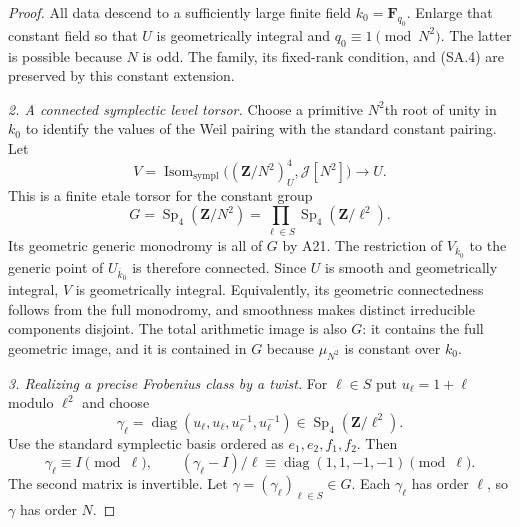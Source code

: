 \begin{proof}
All data descend to a sufficiently large finite field
$k_0=\mathbf F_{q_0}$.  Enlarge that constant field so
that $U$ is geometrically integral and
$q_0\equiv1\pmod{N^2}$.  The latter is possible because
$N$ is odd.  The family, its fixed-rank condition,
and (SA.4) are preserved by this constant extension.

\emph{2. A connected symplectic level torsor.}
Choose a primitive $N^2$th root of unity in $k_0$ to
identify the values of the Weil pairing with the standard
constant pairing.  Let
\[
 V=\operatorname{Isom}_{\mathrm{sympl}}
       \bigl((\mathbf Z/N^2)^4_U,\mathcal J[N^2]\bigr)
                      \longrightarrow U.                    \tag{SA.5}
\]
This is a finite etale torsor for the constant group
\[
       G=\operatorname{Sp}_4(\mathbf Z/N^2)
        =\prod_{\ell\in S}
                       \operatorname{Sp}_4(\mathbf Z/\ell^2).
\]
Its geometric generic monodromy is all of $G$ by A21.
The restriction of $V_{\overline{k}_0}$ to the generic
point of $U_{\overline{k}_0}$ is therefore connected.
Since $U$ is smooth and
geometrically integral, $V$ is geometrically integral.
Equivalently, its geometric connectedness follows from
the full monodromy, and smoothness makes distinct
irreducible components disjoint.
The total arithmetic image is also $G$: it contains
the full geometric image, and it is contained in $G$
because $\mu_{N^2}$ is constant over $k_0$.

\emph{3. Realizing a precise Frobenius class by a twist.}
For $\ell\in S$ put $u_\ell=1+\ell$ modulo $\ell^2$ and
choose
\[
 \gamma_\ell=
 \operatorname{diag}(u_\ell,u_\ell,
                         u_\ell^{-1},u_\ell^{-1})
     \in\operatorname{Sp}_4(\mathbf Z/\ell^2).
                                                               \tag{SA.6}
\]
Use the standard symplectic basis ordered as
$e_1,e_2,f_1,f_2$.  Then
\[
 \gamma_\ell\equiv I\pmod\ell,\qquad
 (\gamma_\ell-I)/\ell
                   \equiv\operatorname{diag}(1,1,-1,-1)
                             \pmod\ell.                       \tag{SA.7}
\]
The second matrix is invertible.
Let $\gamma=(\gamma_\ell)_{\ell\in S}\in G$.
Each $\gamma_\ell$ has order $\ell$, so $\gamma$ has
order $N$.


\end{proof}
